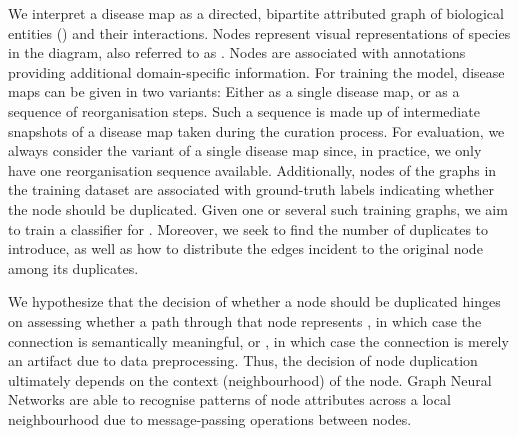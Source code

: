\documentclass[
	fontsize=10pt, %
	twoside=true, %
	secnumdepth=1, %
  toc=indentunnumbered %
]{kaobook}
\begin{document}
We interpret a disease map as a directed, bipartite attributed graph of
biological entities () and their interactions. Nodes represent
visual representations of species in the diagram, also referred to as
. Nodes are associated with annotations providing
additional domain-specific information.
%
For training the model, disease maps can be given in two variants: Either as a
single disease map, or as a sequence of reorganisation steps. Such a sequence is
made up of intermediate snapshots of a disease map taken during the curation
process. For evaluation, we always consider the variant of a single disease map
since, in practice, we only have one reorganisation sequence available.
%
Additionally, nodes of the graphs in the training dataset are associated with
ground-truth labels indicating whether the node should be duplicated. Given one
or several such training graphs, we aim to train a classifier for
.
% 
Moreover, we seek to find the number of duplicates to introduce, as well as how
to distribute the edges incident to the original node among its duplicates.



We hypothesize that the decision of whether a node should be duplicated 
hinges on assessing whether a path through that node represents , in which case the connection is semantically meaningful, or
, in which case the connection is merely an artifact due to
data preprocessing. Thus, the decision of node duplication ultimately depends on
the context (neighbourhood) of the node.
%
%
%
Graph Neural Networks are able to recognise patterns of node attributes across a
local neighbourhood due to message-passing operations between nodes. 
\end{document}
